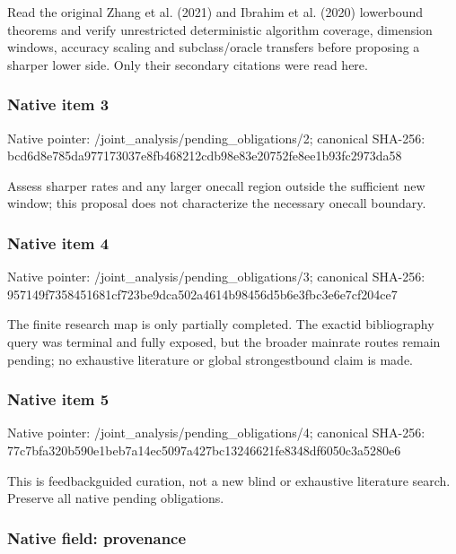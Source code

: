 \documentclass[10pt,a4paper]{article}
\begin{document}
Read the original Zhang et al. (2021) and Ibrahim et al. (2020) lowerbound theorems and verify unrestricted deterministic algorithm coverage, dimension windows, accuracy scaling and subclass/oracle transfers before proposing a sharper lower side. Only their secondary citations were read here.


\subsubsection{Native item 3}


Native pointer: /joint\_analysis/pending\_obligations/2; canonical SHA-256: bcd6d8e785da977173037e8f\allowbreak{}b468212cdb98e83e20752fe8\allowbreak{}ee1b93fc2973da58


Assess sharper rates and any larger onecall region outside the sufficient new window; this proposal does not characterize the necessary onecall boundary.


\subsubsection{Native item 4}


Native pointer: /joint\_analysis/pending\_obligations/3; canonical SHA-256: 957149f7358451681cf723be\allowbreak{}9dca502a4614b98456d5b6e3\allowbreak{}fbc3e6e7cf204ce7


The finite research map is only partially completed. The exactid bibliography query was terminal and fully exposed, but the broader mainrate routes remain pending; no exhaustive literature or global strongestbound claim is made.


\subsubsection{Native item 5}


Native pointer: /joint\_analysis/pending\_obligations/4; canonical SHA-256: 77c7bfa320b590e1beb7a14e\allowbreak{}c5097a427bc13246621fe834\allowbreak{}8df6050c3a5280e6


This is feedbackguided curation, not a new blind or exhaustive literature search. Preserve all native pending obligations.


\subsubsection{Native field: provenance}
\end{document}
